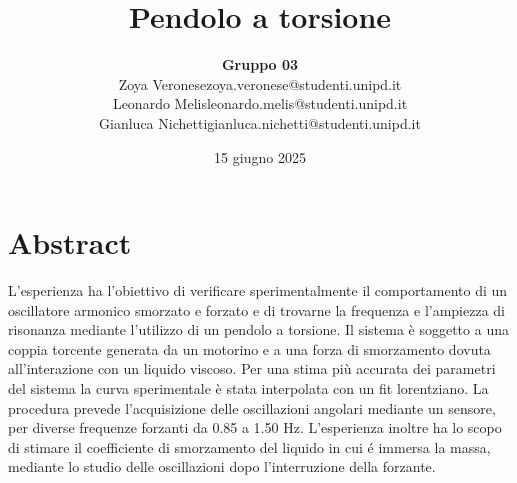 \documentclass{article}
\title{\textbf{Pendolo a torsione}}
\author{\textbf{Gruppo 03}\\Zoya Veronese\qquad2145523\qquad zoya.veronese@studenti.unipd.it\\ Leonardo Melis\qquad 2148583\qquad leonardo.melis@studenti.unipd.it\\ Gianluca Nichetti\qquad 2137786\qquad  gianluca.nichetti@studenti.unipd.it}
\date{15 giugno 2025}
\begin{document}
\maketitle

\section{Abstract}
L'esperienza ha l'obiettivo di verificare sperimentalmente il comportamento di un oscillatore armonico smorzato e forzato e di trovarne la frequenza e l'ampiezza di risonanza mediante l'utilizzo di un pendolo a torsione. Il sistema è soggetto a una coppia torcente generata da un motorino e a una forza di smorzamento dovuta all’interazione con un liquido viscoso. Per una stima più accurata dei parametri del sistema la curva sperimentale è stata interpolata con un fit lorentziano. La procedura prevede l'acquisizione delle oscillazioni angolari mediante un sensore, per diverse frequenze forzanti da 0.85 a 1.50 Hz. L'esperienza inoltre ha lo scopo di stimare il coefficiente di smorzamento del liquido in cui é immersa la massa, mediante lo studio delle oscillazioni dopo l'interruzione della forzante.
\end{document}
